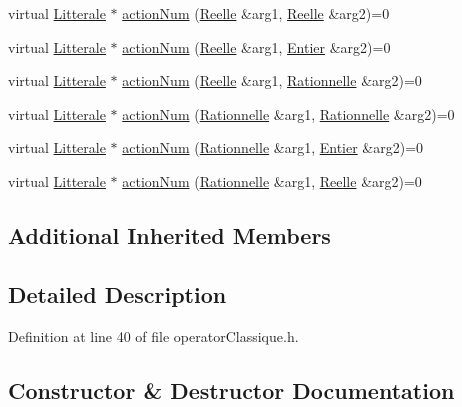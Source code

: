 \begin{DoxyCompactItemize}
\item 
virtual \hyperlink{class_litterale}{Litterale} $\ast$ \hyperlink{class_op_caractere_a934b6964376e4d4075520e92c95f8717}{action\+Num} (\hyperlink{class_reelle}{Reelle} \&arg1, \hyperlink{class_reelle}{Reelle} \&arg2)=0
\item 
virtual \hyperlink{class_litterale}{Litterale} $\ast$ \hyperlink{class_op_caractere_a2a0bd1973a044196ec0de3503fb46438}{action\+Num} (\hyperlink{class_reelle}{Reelle} \&arg1, \hyperlink{class_entier}{Entier} \&arg2)=0
\item 
virtual \hyperlink{class_litterale}{Litterale} $\ast$ \hyperlink{class_op_caractere_a7f7fd7ffda4599eefda1c1811e71fce9}{action\+Num} (\hyperlink{class_reelle}{Reelle} \&arg1, \hyperlink{class_rationnelle}{Rationnelle} \&arg2)=0
\item 
virtual \hyperlink{class_litterale}{Litterale} $\ast$ \hyperlink{class_op_caractere_a17df3c470b50a418111766eaf8159fd3}{action\+Num} (\hyperlink{class_rationnelle}{Rationnelle} \&arg1, \hyperlink{class_rationnelle}{Rationnelle} \&arg2)=0
\item 
virtual \hyperlink{class_litterale}{Litterale} $\ast$ \hyperlink{class_op_caractere_a40a4928d9d1c5024d9a90760333db3e8}{action\+Num} (\hyperlink{class_rationnelle}{Rationnelle} \&arg1, \hyperlink{class_entier}{Entier} \&arg2)=0
\item 
virtual \hyperlink{class_litterale}{Litterale} $\ast$ \hyperlink{class_op_caractere_a11959ee28e27d686eefe5f80307255b5}{action\+Num} (\hyperlink{class_rationnelle}{Rationnelle} \&arg1, \hyperlink{class_reelle}{Reelle} \&arg2)=0
\end{DoxyCompactItemize}
\subsection*{Additional Inherited Members}


\subsection{Detailed Description}


Definition at line 40 of file operator\+Classique.\+h.



\subsection{Constructor \& Destructor Documentation}
